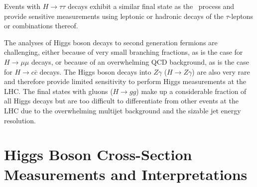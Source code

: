 
Events with $H \to \tau\tau $ decays exhibit a similar final state as the \HWW\ process and provide sensitive measurements using leptonic or hadronic decays of the $\tau$-leptons or combinations thereof.

The analyses of Higgs boson decays to second generation fermions are challenging, either because of very small branching fractions, as is the case for $H \to \mu\mu$ decays, or because of an overwhelming QCD background, as is the case for $H \to c\bar{c}$ decays.
The Higgs boson decays into $Z\gamma$ ($H \to Z\gamma$) are also very rare and therefore provide limited sensitivity to perform Higgs measurements at the LHC. 
The final states with gluons ($H \to gg$) make up a considerable fraction of all Higgs decays but are too difficult to differentiate from other events at the LHC due to the overwhelming multijet background and the sizable jet energy resolution. 


\section{Higgs Boson Cross-Section Measurements and Interpretations}
\label{subsec:xsec-measurements}

